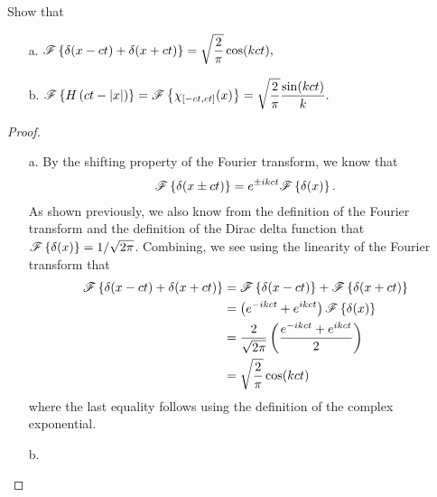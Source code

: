 \begin{problem}{2.2}
  Show that
  \begin{enumerate}
    \item [a.] $\displaystyle \mathscr{F}\left\{ { \delta(x - ct) + \delta(x + ct) } \right\} = \sqrt{ \frac{ 2 }{ \pi} } \cos(kct),$
    \item [b.] $\displaystyle \mathscr{F}\left\{ { H \left( ct - |x| \right) } \right\} = \mathscr{F}\left\{ { \chi_{[-ct, ct]}(x) } \right\}
      = \sqrt{ \frac{ 2 }{ \pi} } \frac{ \sin(kct) }{ k }.$
  \end{enumerate}
\end{problem}

\begin{proof}
  \begin{enumerate}
    \item[a.] By the shifting property of the Fourier transform, we know that
      \begin{align*}
        \mathscr{F}\left\{ {\delta(x \pm ct)} \right\} = e^{\pm ik ct}\mathscr{F}\left\{ {\delta(x)} \right\}.
      \end{align*}
      As shown previously, we also know from the definition of the Fourier transform
      and the definition of the Dirac delta function that $\mathscr{F}\left\{ {\delta(x)} \right\} = 1/\sqrt{2\pi}$. Combining,
      we see using the linearity of the Fourier transform that
      \begin{align*}
        \mathscr{F}\left\{ { \delta(x - ct) + \delta(x + ct) } \right\} &= \mathscr{F}\left\{ { \delta(x - ct)} \right\} + \mathscr{F}\left\{ {\delta(x + ct) } \right\} \\
        &= \left(e^{-ik ct} + e^{ikct} \right)\mathscr{F}\left\{ {\delta(x)} \right\} \\
        &= \frac{2}{\sqrt{2\pi}} \left(\frac{e^{-ik ct} + e^{ikct}}{2}\right) \\
        &= \sqrt{\frac{2}{\pi}}\cos(kct)
      \end{align*}
      where the last equality follows using the definition of the complex exponential.
    \item[b.]
  \end{enumerate}
\end{proof}
\newpage
